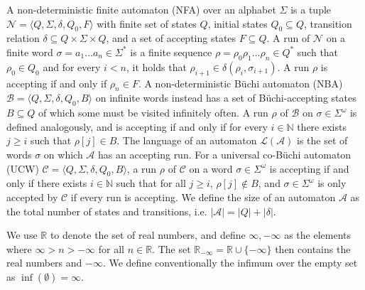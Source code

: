 \documentclass[10pt,a4paper]{article}
\begin{document}
 
 
A non-deterministic finite automaton (NFA) over an alphabet $\Sigma$ is a tuple $\mathcal{N}=\langle Q,\Sigma,\delta,Q_{0},F\rangle$ with finite set of states $Q$, initial states $Q_{0}\subseteq Q$, transition relation $\delta\subseteq Q\times\Sigma\times Q$, and a set of accepting states $F\subseteq Q$. A run of $\mathcal{N}$ on a finite word $\sigma=a_{1}\ldots a_{n}\in\Sigma^{*}$ is a finite sequence $\rho=\rho_{0}\rho_{1}\ldots\rho_{n}\in Q^{*}$ such that $\rho_{0}\in Q_{0}$ and for every $i<n$, it holds that $\rho_{i+1}\in\delta(\rho_{i},\sigma_{i+1})$. A run $\rho$ is accepting if and only if $\rho_{n}\in F$. A non-deterministic Büchi automaton (NBA) $\mathcal{B}=\langle Q,\Sigma,\delta,Q_{0},B\rangle$ on infinite words instead has a set of Büchi-accepting states $B\subseteq Q$ of which some must be visited infinitely often. A run $\rho$ of $\mathcal{B}$ on $\sigma\in\Sigma^{\omega}$ is defined analogously, and is accepting if and only if for every $i\in\mathbb{N}$ there exists $j\geq i$ such that $\rho[j]\in B$. The language of an automaton $\mathcal{L}(\mathcal{A})$ is the set of words $\sigma$ on which $\mathcal{A}$ has an accepting run. For a universal co-Büchi automaton (UCW) $\mathcal{C}=\langle Q,\Sigma,\delta,Q_{0},B\rangle$, a run $\rho$ of $\mathcal{C}$ on a word $\sigma\in\Sigma^{\omega}$ is accepting if and only if there exists $i\in\mathbb{N}$ such that for all $j\geq i$, $\rho[j]\not\in B$, and $\sigma\in\Sigma^{\omega}$ is only accepted by $\mathcal{C}$ if every run is accepting. We define the size of an automaton $\mathcal{A}$ as the total number of states and transitions, i.e. $|\mathcal{A}|=|Q|+|\delta|$.\par
 
 
 
We use $\mathbb{R}$ to denote the set of real numbers, and define $\infty,-\infty$ as the elements where $\infty>n>-\infty$ for all $n\in\mathbb{R}$. The set $\mathbb{R}_{-\infty}=\mathbb{R}\cup\{-\infty\}$ then contains the real numbers and $-\infty$. We define conventionally the infimum over the empty set as $\inf(\emptyset)=\infty$.\par
 
 
 
 
\end{document}
